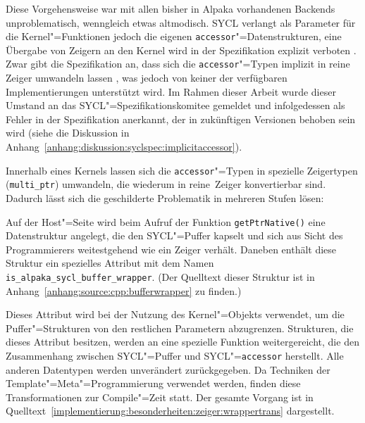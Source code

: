 Diese Vorgehensweise war mit allen bisher in Alpaka vorhandenen Backends
unproblematisch, wenngleich etwas altmodisch. SYCL verlangt als Parameter für
die Kernel"=Funktionen jedoch die eigenen \texttt{accessor}"=Datenstrukturen,
eine Übergabe von Zeigern an den Kernel wird in der Spezifikation explizit
verboten \cite[vgl.][192]{sycl2019}. Zwar gibt die Spezifikation an, dass sich
die \texttt{accessor}"=Typen implizit in reine Zeiger umwandeln lassen
\cite[vgl.][27]{sycl2019}, was jedoch von keiner der verfügbaren
Implementierungen unterstützt wird. Im Rahmen dieser Arbeit wurde dieser Umstand
an das SYCL"=Spezifikationskomitee gemeldet und infolgedessen als Fehler in der
Spezifikation anerkannt, der in zukünftigen Versionen behoben sein wird (siehe
die Diskussion in Anhang~\ref{anhang:diskussion:syclspec:implicitaccessor}).

Innerhalb eines Kernels lassen sich die \texttt{accessor}"=Typen in spezielle
Zeigertypen (\texttt{multi\_ptr}) umwandeln, die wiederum in \glqq reine\grqq\
Zeiger konvertierbar sind. Dadurch lässt sich die geschilderte Problematik in
mehreren Stufen lösen:

Auf der Host"=Seite wird beim Aufruf der Funktion \texttt{getPtrNative()} eine
Datenstruktur angelegt, die den SYCL"=Puffer kapselt und sich aus Sicht des
Programmierers weitestgehend wie ein Zeiger verhält. Daneben enthält diese
Struktur ein spezielles Attribut mit dem Namen
\texttt{is\_alpaka\_sycl\_buffer\_wrapper}. (Der Quelltext dieser Struktur ist
in Anhang~\ref{anhang:source:cpp:bufferwrapper} zu finden.)

Dieses Attribut wird bei der Nutzung des Kernel"=Objekts verwendet, um die
Puffer"=Strukturen von den restlichen Parametern abzugrenzen. Strukturen, die
dieses Attribut besitzen, werden an eine spezielle Funktion weitergereicht, die
den Zusammenhang zwischen SYCL"=Puffer und SYCL"=\texttt{accessor} herstellt.
Alle anderen Datentypen werden unverändert zurückgegeben. Da Techniken der
Template"=Meta"=Programmierung verwendet werden, finden diese Transformationen
zur Compile"=Zeit statt. Der gesamte Vorgang ist in
Quelltext~\ref{implementierung:besonderheiten:zeiger:wrappertrans} dargestellt.

